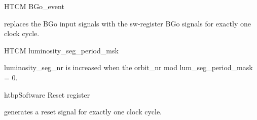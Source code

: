 \begin{register}{H}{TCM BGo\_event}{}%
    \label{bgos_event}%
    \regnewline%
    \begin{regdesc}
    \begin{reglist}
        \item [BGo\_event] replaces the BGo input signals with the sw-register BGo signals for exactly one clock cycle.
    \end{reglist}
    \end{regdesc}
\end{register}

\begin{register}{H}{TCM luminosity\_seg\_period\_msk}{}%
    \label{luminosity_seg_period_msk}%
    \begin{regdesc}
    \begin{reglist}
         \item [luminosity\_seg\_period\_msk] luminosity\_seg\_nr is increased when the orbit\_nr mod lum\_seg\_period\_mask = 0.
    \end{reglist}
    \end{regdesc}
\end{register}

\begin{register}{htbp}{Software Reset register}{}%
    \label{tcm_ctrl_reg}%
    \regnewline%
    \begin{regdesc}
    \begin{reglist}
        \item [sw\_reset\_event] generates a reset signal for exactly one clock cycle.
    \end{reglist}
    \end{regdesc}
\end{register}

\clearpage

